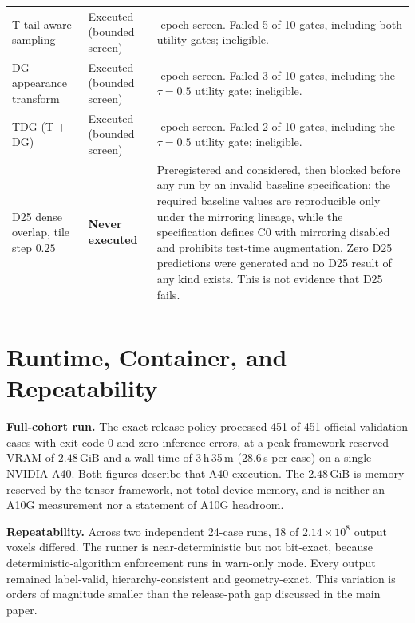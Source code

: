 \documentclass[runningheads]{llncs}
\begin{document}
{\begin{longtable}{@{}>{\raggedright\arraybackslash}p{}>{\raggedright\arraybackslash}p{}>{\raggedright\arraybackslash}p{}@{}}
\addlinespace[2pt]
T tail-aware sampling & Executed (bounded screen) & 40-epoch screen. Failed 5 of 10 gates, including both utility gates; ineligible. \\
\addlinespace[2pt]
DG appearance transform & Executed (bounded screen) & 40-epoch screen. Failed 3 of 10 gates, including the $\tau=0.5$ utility gate; ineligible. \\
\addlinespace[2pt]
TDG (T $+$ DG) & Executed (bounded screen) & 40-epoch screen. Failed 2 of 10 gates, including the $\tau=0.5$ utility gate; ineligible. \\
\addlinespace[2pt]
D25 dense overlap, tile step $0.25$ & \textbf{Never executed} & Preregistered and considered, then blocked before any run by an invalid baseline specification: the required baseline values are reproducible only under the mirroring lineage, while the specification defines C0 with mirroring disabled and prohibits test-time augmentation. Zero D25 predictions were generated and no D25 result of any kind exists. This is not evidence that D25 fails. \\
\addlinespace[2pt]
\end{longtable}
}


\section{Runtime, Container, and Repeatability}

\noindent\textbf{Full-cohort run.} The exact release policy processed 451 of 451 official validation
cases with exit code $0$ and zero inference errors, at a peak framework-reserved VRAM of
$2.48$\,GiB and a wall time of 3\,h\,35\,m ($28.6$\,s per case) on a single NVIDIA A40. Both figures
describe that A40 execution. The $2.48$\,GiB is memory reserved by the tensor framework, not total
device memory, and is neither an A10G measurement nor a statement of A10G headroom.

\medskip\noindent\textbf{Repeatability.} Across two independent 24-case runs, 18 of
$2.14\times10^{8}$ output voxels differed. The runner is near-deterministic but not bit-exact,
because deterministic-algorithm enforcement runs in warn-only mode. Every output remained
label-valid, hierarchy-consistent and geometry-exact. This variation is orders of magnitude smaller
than the release-path gap discussed in the main paper.
\end{document}
